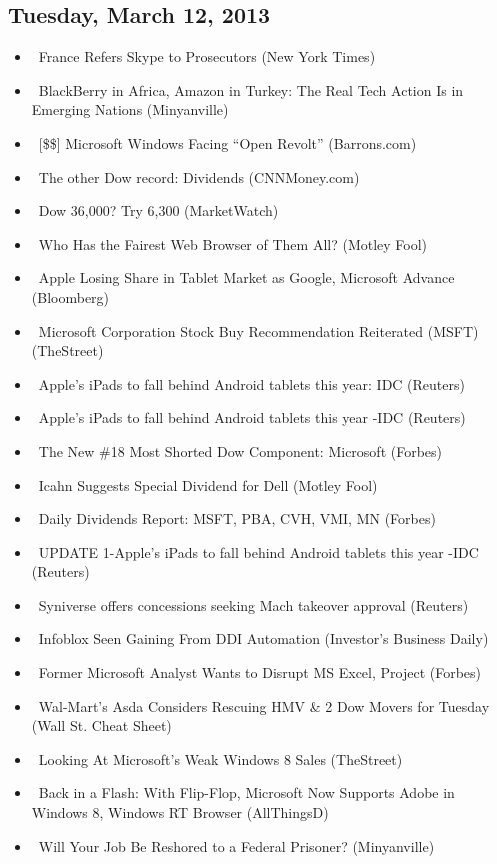 \documentclass[11pt,asymmetric]{article}
\begin{document}
\subsection*{Tuesday, March 12, 2013}
\begin{itemize}
\item\ France Refers Skype to Prosecutors (New York Times)
\item\ BlackBerry in Africa, Amazon in Turkey: The Real Tech Action Is in Emerging Nations (Minyanville)
\item\ [\$\$] Microsoft Windows Facing ``Open Revolt'' (Barrons.com)
\item\ The other Dow record: Dividends (CNNMoney.com)
\item\ Dow 36,000? Try 6,300 (MarketWatch)
\item\ Who Has the Fairest Web Browser of Them All? (Motley Fool)
\item\ Apple Losing Share in Tablet Market as Google, Microsoft Advance (Bloomberg)
\item\ Microsoft Corporation Stock Buy Recommendation Reiterated (MSFT) (TheStreet)
\item\ Apple's iPads to fall behind Android tablets this year: IDC (Reuters)
\item\ Apple's iPads to fall behind Android tablets this year -IDC (Reuters)
\item\ The New \#18 Most Shorted Dow Component: Microsoft (Forbes)
\item\ Icahn Suggests Special Dividend for Dell (Motley Fool)
\item\ Daily Dividends Report: MSFT, PBA, CVH, VMI, MN (Forbes)
\item\ UPDATE 1-Apple's iPads to fall behind Android tablets this year -IDC (Reuters)
\item\ Syniverse offers concessions seeking Mach takeover approval (Reuters)
\item\ Infoblox Seen Gaining From DDI Automation (Investor's Business Daily)
\item\ Former Microsoft Analyst Wants to Disrupt MS Excel, Project (Forbes)
\item\ Wal-Mart’s Asda Considers Rescuing HMV \& 2 Dow Movers for Tuesday (Wall St. Cheat Sheet)
\item\ Looking At Microsoft's Weak Windows 8 Sales (TheStreet)
\item\ Back in a Flash: With Flip-Flop, Microsoft Now Supports Adobe in Windows 8, Windows RT Browser (AllThingsD)
\item\ Will Your Job Be Reshored to a Federal Prisoner? (Minyanville)

\end{itemize}
\end{document}

